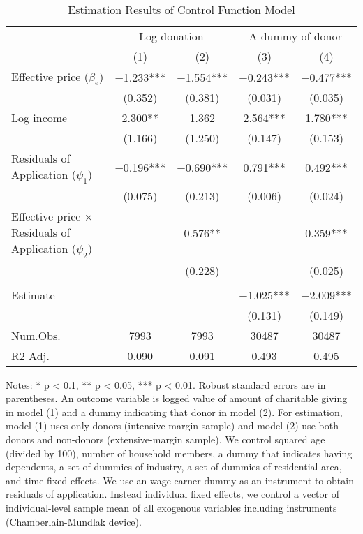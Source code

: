 \begin{table}

\caption{Estimation Results of Control Function Model\label{tab:cf}}
\centering
\fontsize{8}{10}\selectfont
\begin{threeparttable}
\begin{tabular}[t]{lcccc}
\toprule
\multicolumn{1}{c}{ } & \multicolumn{2}{c}{Log donation} & \multicolumn{2}{c}{A dummy of donor} \\
\cmidrule(l{3pt}r{3pt}){2-3} \cmidrule(l{3pt}r{3pt}){4-5}
  & (1) & (2) & (3) & (4)\\
\midrule
Effective price ($\beta_e$) & \num{-1.233}*** & \num{-1.554}*** & \num{-0.243}*** & \num{-0.477}***\\
 & (\num{0.352}) & (\num{0.381}) & (\num{0.031}) & (\num{0.035})\\
Log income & \num{2.300}** & \num{1.362} & \num{2.564}*** & \num{1.780}***\\
 & (\num{1.166}) & (\num{1.250}) & (\num{0.147}) & (\num{0.153})\\
Residuals of Application ($\psi_1$) & \num{-0.196}*** & \num{-0.690}*** & \num{0.791}*** & \num{0.492}***\\
 & (\num{0.075}) & (\num{0.213}) & (\num{0.006}) & (\num{0.024})\\
Effective price $\times$ Residuals of Application ($\psi_2$) &  & \num{0.576}** &  & \num{0.359}***\\
 &  & (\num{0.228}) &  & (\num{0.025})\\
\midrule
\addlinespace[0.3em]
\multicolumn{5}{l}{\textit{Implied price elasticity}}\\
\hspace{1em}Estimate &  &  & \num{-1.025}*** & \num{-2.009}***\\
\hspace{1em} &  &  & (\num{0.131}) & (\num{0.149})\\
Num.Obs. & \num{7993} & \num{7993} & \num{30487} & \num{30487}\\
R2 Adj. & \num{0.090} & \num{0.091} & \num{0.493} & \num{0.495}\\
\bottomrule
\end{tabular}
\begin{tablenotes}
\item Notes: * p < 0.1, ** p < 0.05, *** p < 0.01. Robust standard errors are in parentheses. An outcome variable is logged value of amount of charitable giving in model (1) and a dummy indicating that donor in model (2). For estimation, model (1) uses only donors (intensive-margin sample) and model (2) use both donors and non-donors (extensive-margin sample). We control squared age (divided by 100), number of household members, a dummy that indicates having dependents, a set of dummies of industry, a set of dummies of residential area, and time fixed effects. We use an wage earner dummy as an instrument to obtain residuals of application. Instead individual fixed effects, we control a vector of individual-level sample mean of all exogenous variables including instruments (Chamberlain-Mundlak device).
\end{tablenotes}
\end{threeparttable}
\end{table}
